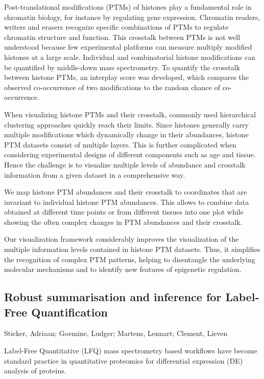 {Post-translational modifications (PTMs) of histones play a fundamental role in chromatin biology, for instance by regulating gene expression. Chromatin readers, writers and erasers recognize specific combinations of PTMs to regulate chromatin structure and function. This crosstalk between PTMs is not well understood because few experimental platforms can measure multiply modified histones at a large scale. Individual and combinatorial histone modifications can be quantified by middle-down mass spectrometry. To quantify the crosstalk between histone PTMs, an interplay score was developed, which compares the observed co-occurrence of two modifications to the random chance of co-occurrence.

When visualizing histone PTMs and their crosstalk, commonly used hierarchical clustering approaches quickly reach their limits. Since histones generally carry multiple modifications which dynamically change in their abundances, histone PTM datasets consist of multiple layers. This is further complicated when considering experimental designs of different components such as age and tissue. Hence the challenge is to visualize multiple levels of abundance and crosstalk information from a given dataset in a comprehensive way.

We map histone PTM abundances and their crosstalk to coordinates that are invariant to individual histone PTM abundances. This allows to combine data obtained at different time points or from different tissues into one plot while showing the often complex changes in PTM abundances and their crosstalk.

Our visualization framework considerably improves the visualization of the multiple information levels contained in histone PTM datasets. Thus, it simplifies the recognition of complex PTM patterns, helping to disentangle the underlying molecular mechanisms and to identify new features of epigenetic regulation.


\subsection*{\color{eubicRed} Robust summarisation and inference for Label-Free Quantification}
{\color{eubicGray}Sticker, Adriaan;
Goemine, Ludger;
Martens, Lennart;
Clement, Lieven}

Label-Free Quantitative (LFQ) mass spectrometry based workflows have become standard practice in quantitative proteomics for differential expression (DE) analysis of proteins.

}
